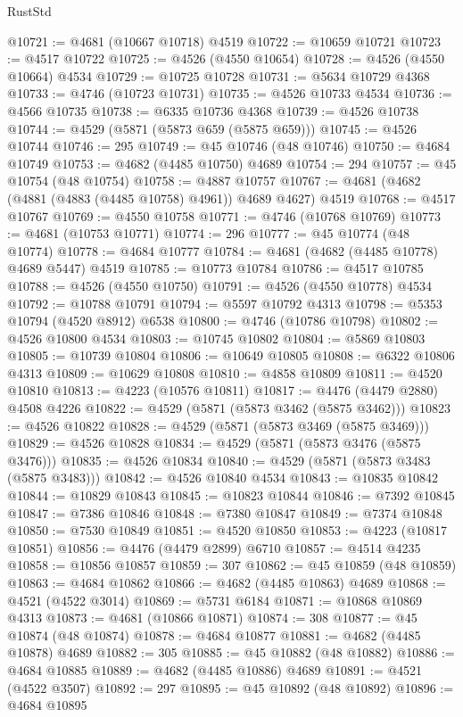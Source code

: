 \begin{lexlean}{RustStd}
\begin{coremodule}
@10721 := @4681 (@10667 @10718) @4519
@10722 := @10659 @10721
@10723 := @4517 @10722
@10725 := @4526 (@4550 @10654)
@10728 := @4526 (@4550 @10664) @4534
@10729 := @10725 @10728
@10731 := @5634 @10729 @4368
@10733 := @4746 (@10723 @10731)
@10735 := @4526 @10733 @4534
@10736 := @4566 @10735
@10738 := @6335 @10736 @4368
@10739 := @4526 @10738
@10744 := @4529 (@5871 (@5873 @659 (@5875 @659)))
@10745 := @4526 @10744
@10746 := 295
@10749 := @45 @10746 (@48 @10746)
@10750 := @4684 @10749
@10753 := @4682 (@4485 @10750) @4689
@10754 := 294
@10757 := @45 @10754 (@48 @10754)
@10758 := @4887 @10757
@10767 := @4681 (@4682 (@4881 (@4883 (@4485 @10758) @4961)) @4689 @4627) @4519
@10768 := @4517 @10767
@10769 := @4550 @10758
@10771 := @4746 (@10768 @10769)
@10773 := @4681 (@10753 @10771)
@10774 := 296
@10777 := @45 @10774 (@48 @10774)
@10778 := @4684 @10777
@10784 := @4681 (@4682 (@4485 @10778) @4689 @5447) @4519
@10785 := @10773 @10784
@10786 := @4517 @10785
@10788 := @4526 (@4550 @10750)
@10791 := @4526 (@4550 @10778) @4534
@10792 := @10788 @10791
@10794 := @5597 @10792 @4313
@10798 := @5353 @10794 (@4520 @8912) @6538
@10800 := @4746 (@10786 @10798)
@10802 := @4526 @10800 @4534
@10803 := @10745 @10802
@10804 := @5869 @10803
@10805 := @10739 @10804
@10806 := @10649 @10805
@10808 := @6322 @10806 @4313
@10809 := @10629 @10808
@10810 := @4858 @10809
@10811 := @4520 @10810
@10813 := @4223 (@10576 @10811)
@10817 := @4476 (@4479 @2880) @4508 @4226
@10822 := @4529 (@5871 (@5873 @3462 (@5875 @3462)))
@10823 := @4526 @10822
@10828 := @4529 (@5871 (@5873 @3469 (@5875 @3469)))
@10829 := @4526 @10828
@10834 := @4529 (@5871 (@5873 @3476 (@5875 @3476)))
@10835 := @4526 @10834
@10840 := @4529 (@5871 (@5873 @3483 (@5875 @3483)))
@10842 := @4526 @10840 @4534
@10843 := @10835 @10842
@10844 := @10829 @10843
@10845 := @10823 @10844
@10846 := @7392 @10845
@10847 := @7386 @10846
@10848 := @7380 @10847
@10849 := @7374 @10848
@10850 := @7530 @10849
@10851 := @4520 @10850
@10853 := @4223 (@10817 @10851)
@10856 := @4476 (@4479 @2899) @6710
@10857 := @4514 @4235
@10858 := @10856 @10857
@10859 := 307
@10862 := @45 @10859 (@48 @10859)
@10863 := @4684 @10862
@10866 := @4682 (@4485 @10863) @4689
@10868 := @4521 (@4522 @3014)
@10869 := @5731 @6184
@10871 := @10868 @10869 @4313
@10873 := @4681 (@10866 @10871)
@10874 := 308
@10877 := @45 @10874 (@48 @10874)
@10878 := @4684 @10877
@10881 := @4682 (@4485 @10878) @4689
@10882 := 305
@10885 := @45 @10882 (@48 @10882)
@10886 := @4684 @10885
@10889 := @4682 (@4485 @10886) @4689
@10891 := @4521 (@4522 @3507)
@10892 := 297
@10895 := @45 @10892 (@48 @10892)
@10896 := @4684 @10895

\end{coremodule}
\end{lexlean}

